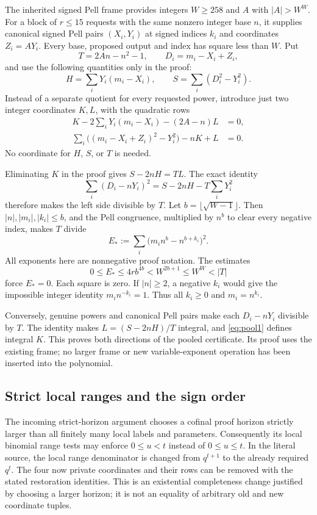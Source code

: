 \documentclass[11pt]{article}
\theoremstyle{remark}\newtheorem{remark}[theorem]{Remark}
\begin{document}
The inherited signed Pell frame provides integers $W\ge258$ and $A$
with $|A|>W^W$. For a block of $r\le15$ requests with the same
nonzero integer base $n$, it supplies canonical signed Pell pairs
$(X_i,Y_i)$ at signed indices $k_i$ and coordinates $Z_i=AY_i$.
Every base, proposed output and index has square less than $W$.
Put
\[
 T=2An-n^2-1,\qquad D_i=m_i-X_i+Z_i,
\]
and use the following quantities only in the proof:
\[
 H=\sum_iY_i(m_i-X_i),\qquad
 S=\sum_i(D_i^2-Y_i^2).
\]
Instead of a separate quotient for every requested power, introduce
just two integer coordinates $K,L$, with the quadratic rows
\begin{align}
 K-2\sum_iY_i(m_i-X_i)-(2A-n)L&=0,\label{eq:pool1}\\
 \sum_i\bigl((m_i-X_i+Z_i)^2-Y_i^2\bigr)-nK+L&=0.
 \label{eq:pool2}
\end{align}
No coordinate for $H$, $S$, or $T$ is needed.

Eliminating $K$ in the proof gives $S-2nH=TL$. The exact identity
\[
 \sum_i(D_i-nY_i)^2=S-2nH-T\sum_iY_i^2
\]
therefore makes the left side divisible by $T$.
Let $b=\lfloor\sqrt{W-1}\rfloor$. Then
$|n|,|m_i|,|k_i|\le b$, and the Pell congruence, multiplied by
$n^b$ to clear every negative index, makes $T$ divide
\[
 E_*:=\sum_i\bigl(m_i n^b-n^{b+k_i}\bigr)^2.
\]
All exponents here are nonnegative proof notation. The estimates
\[
 0\le E_*\le4r b^{4b}<W^{2b+1}\le W^W<|T|
\]
force $E_*=0$. Each square is zero. If $|n|\ge2$, a negative
$k_i$ would give the impossible integer identity $m_i n^{-k_i}=1$.
Thus all $k_i\ge0$ and $m_i=n^{k_i}$.

Conversely, genuine powers and canonical Pell pairs make each
$D_i-nY_i$ divisible by $T$. The identity makes
$L=(S-2nH)/T$ integral, and \eqref{eq:pool1} defines integral $K$.
This proves both directions of the pooled certificate. Its proof uses
the existing frame; no larger frame or new variable-exponent operation
has been inserted into the polynomial.

\subsection{Strict local ranges and the sign order}

The incoming strict-horizon argument chooses a cofinal proof horizon
strictly larger than all finitely many local labels and parameters.
Consequently its local binomial range tests may enforce $0\le u<t$
instead of $0\le u\le t$. In the literal source, the local range
denominator is changed from $q^{t+1}$ to the already required $q^t$.
The four now private coordinates and their rows can be removed with
the stated restoration identities. This is an existential completeness
change justified by choosing a larger horizon; it is not an equality
of arbitrary old and new coordinate tuples.
\end{document}
